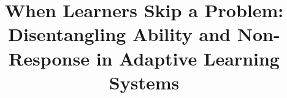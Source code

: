 \documentclass[11pt]{article}
\begin{document}
 


\title{When Learners Skip a Problem: Disentangling Ability and Non-Response in Adaptive Learning Systems}
\date{}
\maketitle


\begin{abstract}



\end{abstract}
\end{document}
